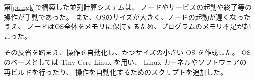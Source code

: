 \label{pa:namikilinux}

第\ref{pa:ngk}\postmpartname{}で構築した並列計算システムは、
ノードやサービスの起動や終了等の操作が手動であった。
また、OSのサイズが大きく、ノードの起動が遅くなったうえ、
ノードはOS全体をメモリに保持するため、プログラムのメモリ不足が起こった。

その反省を踏まえ、操作を自動化し、かつサイズの小さい OS を作成した。
OS のベースとしては Tiny Core Linux \cite{bib:tc} を用い、
Linux カーネルやソフトウェアの再ビルドを行ったり、
操作を自動化するためのスクリプトを追加した。

